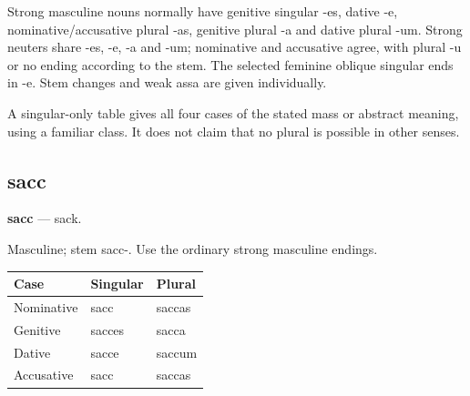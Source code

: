 Strong masculine nouns normally have genitive singular -es, dative -e, nominative/\allowbreak{}accusative plural -as, genitive plural -a and dative plural -um. Strong neuters share -es, -e, -a and -um; nominative and accusative agree, with plural -u or no ending according to the stem. The selected feminine oblique singular ends in -e. Stem changes and weak assa are given individually.

A singular-only table gives all four cases of the stated mass or abstract meaning, using a familiar class. It does not claim that no plural is possible in other senses.

\subsection*{sacc}

\par\begin{minipage}{\linewidth}\raggedright
\textbf{sacc} — sack.

Masculine; stem sacc-. Use the ordinary strong masculine endings.

\par\begingroup
\fontsize{10.5}{13.2}\selectfont
\setlength{\LTleft}{0pt}\setlength{\LTright}{\fill}
\noindent
\begin{tabular}{@{}>{\raggedright\arraybackslash}p{39.46mm}>{\raggedright\arraybackslash}p{39.46mm}>{\raggedright\arraybackslash}p{39.46mm}@{}}
\toprule
\textbf{Case} & \textbf{Singular} & \textbf{Plural} \\
\midrule
Nominative & sacc & saccas \\
Genitive & sacces & sacca \\
Dative & sacce & saccum \\
Accusative & sacc & saccas \\
\bottomrule
\end{tabular}
\par\endgroup

\end{minipage}\par
{}
